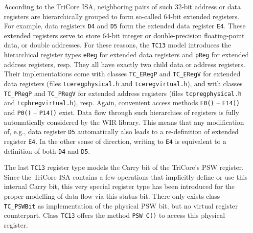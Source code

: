 According to the TriCore \gls{ISA}, neighboring pairs of such 32-bit address or data registers are hierarchically grouped to form so-called 64-bit extended registers.
For example, data registers \texttt{D4} and \texttt{D5} form the extended data register \texttt{E4}.
These extended registers serve to store 64-bit integer or double-precision floating-point data, or double addresses.
For these reasons, the \texttt{TC13} model introduces the hierarchical register types \texttt{eReg} for extended data registers and \texttt{pReg} for extended address registers, resp.
They all have exactly two child data or address registers.
Their implementations come with classes \texttt{TC\_ERegP} and \texttt{TC\_ERegV} for extended data registers (files \texttt{tceregphysical.h} and \texttt{tceregvirtual.h}), and with classes \texttt{TC\_PRegP} and \texttt{TC\_PRegV} for extended address registers (files \texttt{tcpregphysical.h} and \texttt{tcphregvirtual.h}), resp.
Again, convenient access methods \texttt{E0()} -- \texttt{E14()} and \texttt{P0()} -- \texttt{P14()} exist.
Data flow through such hierarchies of registers is fully automatically considered by the \gls{WIR} library.
This means that any modification of, e.g., data register \texttt{D5} automatically also leads to a re-definition of extended register \texttt{E4}.
In the other sense of direction, writing to \texttt{E4} is equivalent to a definition of both \texttt{D4} and \texttt{D5}.

The last \texttt{TC13} register type models the Carry bit of the TriCore's \gls{PSW} register.
Since the TriCore \gls{ISA} contains a few operations that implicitly define or use this internal Carry bit, this very special register type has been introduced for the proper modelling of data flow via this status bit.
There only exists class \texttt{TC\_PSWBit} as implementation of the physical \gls{PSW} bit, but no virtual register counterpart.
Class \texttt{TC13} offers the method \texttt{PSW\_C()} to access this physical register.

